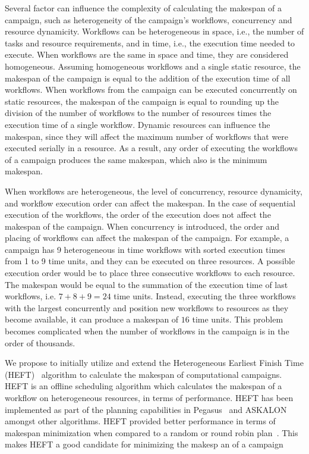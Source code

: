 Several factor can influence the complexity of calculating the makespan of a campaign, such as heterogeneity of the campaign's workflows, concurrency and resource dynamicity.
Workflows can be heterogeneous in space, i.e., the number of tasks and resource requirements, and in time, i.e., the execution time needed to execute.
When workflows are the same in space and time, they are considered homogeneous.
Assuming homogeneous workflows and a single static resource, the makespan of the campaign is equal to the addition of the execution time of all workflows.
When workflows from the campaign can be executed concurrently on static resources, the makespan of the campaign is equal to rounding up the division of the number of workflows to the number of resources times the execution time of a single workflow.
Dynamic resources can influence the makespan, since they will affect the maximum number of workflows that were executed serially in a resource.
As a result, any order of executing the workflows of a campaign produces the same makespan, which also is the minimum makespan.

When workflows are heterogeneous, the level of concurrency, resource dynamicity, and workflow execution order can affect the makespan.
In the case of sequential execution of the workflows, the order of the execution does not affect the makespan of the campaign.
When concurrency is introduced, the order and placing of workflows can affect the makespan of the campaign.
For example, a campaign has 9 heterogeneous in time workflows with sorted execution times from 1 to 9 time units, and they can be executed on three resources.
A possible execution order would be to place three consecutive workflows to each resource.
The makespan would be equal to the summation of the execution time of last workflows, i.e. $7 + 8 + 9 = 24$ time units.
Instead, executing the three workflows with the largest concurrently and position new workflows to resources as they become available, it can produce a makespan of $16$ time units.
This problem becomes complicated when the number of workflows in the campaign is in the order of thousands.



We propose to initially utilize and extend the Heterogeneous Earliest Finish Time (HEFT)~\cite{topcuoglu2002performance} algorithm to calculate the makespan of computational campaigns.
HEFT is an offline scheduling algorithm which calculates the makespan of a workflow on heterogeneous resources, in terms of performance.
HEFT has been implemented as part of the planning capabilities in Pegasus~\cite{deelman2015pegasus} and ASKALON~\cite{fahringer2005askalon} amongst other algorithms.
HEFT provided better performance in terms of makespan minimization when compared to a random or round robin plan~\cite{deelman2015pegasus}.
This makes HEFT a good candidate for minimizing the makesp an of a campaign


